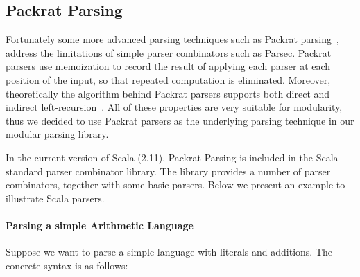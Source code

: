 \subsection{Packrat Parsing}\label{subsec:packratparsing}
Fortunately some more advanced parsing techniques such as Packrat parsing~\cite{Ford2002}, address the limitations of simple parser combinators such as Parsec. Packrat parsers use memoization to record the result of applying each parser at each position of the input, so that repeated computation is eliminated.  Moreover, theoretically the algorithm behind Packrat parsers supports both direct and indirect left-recursion~\cite{warth2008}. All of these properties are very suitable for modularity, thus we decided to use Packrat parsers as the underlying parsing technique in our modular parsing library.
\begin{comment}
It is worth mentioning that the choice of parser combinators will not
affect the other parts of our library. One can choose other parser
combinators like Parsec, in cases that the performance and supporting
of left-recursion are not major concerns. A different library can even build a new
\name with fancy features or higher efficiency.
\end{comment}
In the current version of Scala (2.11), Packrat Parsing is included
in the Scala standard parser combinator library. The library provides a number of
parser combinators, together with some basic parsers. Below we present an example to illustrate Scala parsers.
%

\paragraph{Parsing a simple Arithmetic Language}
Suppose we want to parse a simple language with literals and
additions. The concrete syntax is as follows:

